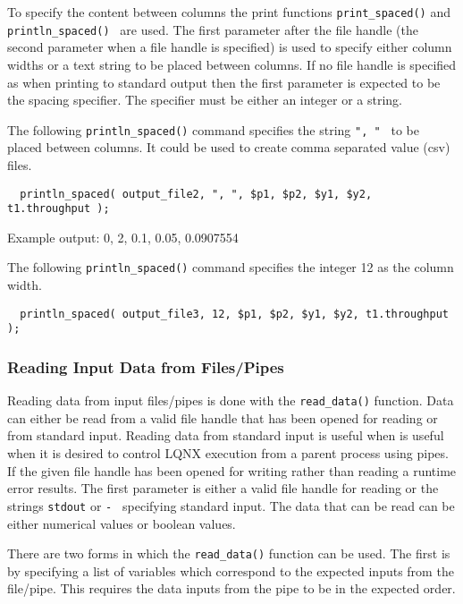 To specify the content between columns the print functions {\tt print\_spaced()} and {\tt println\_spaced() }
are used. The first parameter after the file handle (the second parameter when a file handle is specified) is 
used to specify either column widths or a text string to be placed between columns. If no file handle is specified
as when printing to standard output then the first parameter is expected to be the spacing specifier. The specifier
must be either an integer or a string.

The following {\tt println\_spaced()} command specifies the string {\tt ", " } to be placed between columns. It could be used
to create comma separated value (csv) files.

\lstset{language=C++}
\begin{lstlisting}
  println_spaced( output_file2, ", ", $p1, $p2, $y1, $y2, t1.throughput );
\end{lstlisting}

Example output: 0, 2, 0.1, 0.05, 0.0907554

The following {\tt println\_spaced()} command specifies the integer 12 as the column width.

\lstset{language=C++}
\begin{lstlisting}
  println_spaced( output_file3, 12, $p1, $p2, $y1, $y2, t1.throughput );
\end{lstlisting}

\subsubsection{Reading Input Data from Files/Pipes}

Reading data from input files/pipes is done with the {\tt read\_data()} function. Data can either be read from a valid
file handle that has been opened for reading or from standard input. Reading data from standard input is useful when
is useful when it is desired to control LQNX execution from a parent process using pipes.
If the given file handle has been opened for writing rather than reading a runtime error results. The first 
parameter is either a valid file handle for reading or the strings {\tt stdout} or {\tt - } specifying 
standard input. The data that can be read can be either numerical values or boolean values.

There are two forms in which the {\tt read\_data()} function can be used. The first is by specifying a list of
\ModLang variables which correspond to the expected inputs from the file/pipe. This requires the data inputs
from the pipe to be in the expected order.

